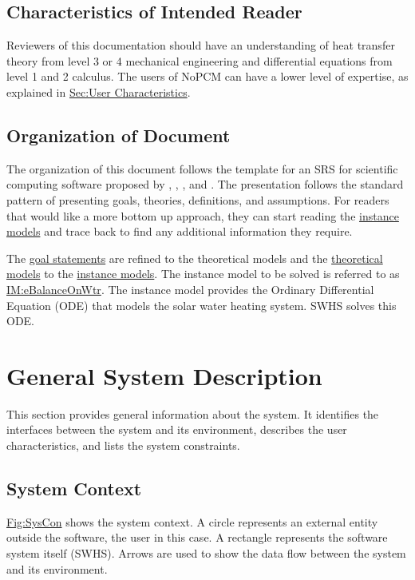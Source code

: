\documentclass[12pt]{article}
\begin{document}
\subsection{Characteristics of Intended Reader}
\label{Sec:ReaderChars}
Reviewers of this documentation should have an understanding of heat transfer theory from level 3 or 4 mechanical engineering and differential equations from level 1 and 2 calculus. The users of NoPCM can have a lower level of expertise, as explained in \hyperref[Sec:UserChars]{Sec:User Characteristics}.

\subsection{Organization of Document}
\label{Sec:DocOrg}
The organization of this document follows the template for an SRS for scientific computing software proposed by \cite{koothoor2013}, \cite{smithLai2005}, \cite{smithEtAl2007}, and \cite{smithKoothoor2016}. The presentation follows the standard pattern of presenting goals, theories, definitions, and assumptions. For readers that would like a more bottom up approach, they can start reading the \hyperref[Sec:IMs]{instance models} and trace back to find any additional information they require.

The \hyperref[Sec:GoalStmt]{goal statements} are refined to the theoretical models and the \hyperref[Sec:TMs]{theoretical models} to the \hyperref[Sec:IMs]{instance models}. The instance model to be solved is referred to as \hyperref[IM:eBalanceOnWtr]{IM:eBalanceOnWtr}. The instance model provides the Ordinary Differential Equation (ODE) that models the solar water heating system. SWHS solves this ODE.

\section{General System Description}
\label{Sec:GenSysDesc}
This section provides general information about the system. It identifies the interfaces between the system and its environment, describes the user characteristics, and lists the system constraints.

\subsection{System Context}
\label{Sec:SysContext}
\hyperref[Figure:SysCon]{Fig:SysCon} shows the system context. A circle represents an external entity outside the software, the user in this case. A rectangle represents the software system itself (SWHS). Arrows are used to show the data flow between the system and its environment.
\end{document}
